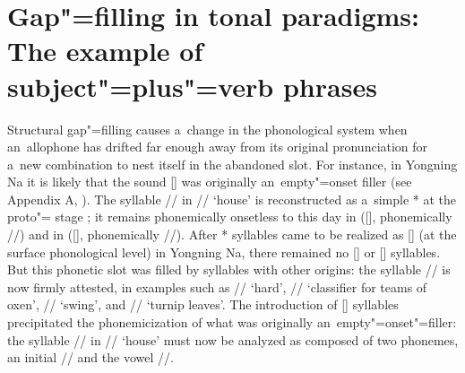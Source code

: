 \section[Gap"=filling in tonal paradigms]{Gap"=filling in tonal paradigms: The example of subject"=plus"=verb phrases}
\label{sec:howthesuffixacquiresitslmorhtoneafteramtoneverb}

Structural gap"=filling causes a~change in the phonological system when an~allophone has
drifted far enough away from its original pronunciation for a~new combination to nest itself in the abandoned slot. For
instance, in Yongning Na it is likely that the sound [] was originally an~empty"=onset filler (see Appendix A, ). The syllable // in
// ‘house’ is reconstructed as a~simple * at the proto"= stage \citep{jacquesetal2011}; it remains
phonemically onsetless to this day in  ([], phonemically //) and in 
([], phonemically //). After * syllables came to be realized as [] (at the surface phonological level) in Yongning Na, there
remained no [] or [] syllables. But this phonetic slot was filled by syllables
with other origins: the syllable // is now firmly attested, in examples such as // ‘hard’, // ‘{classifier} for teams of oxen’, // ‘swing’, and // ‘turnip leaves’. The introduction of [] syllables precipitated the phonemicization of what was originally an~empty"=onset"=filler:
the syllable // in // ‘house’ must now be analyzed as composed of two phonemes, an initial
// and the vowel //.

